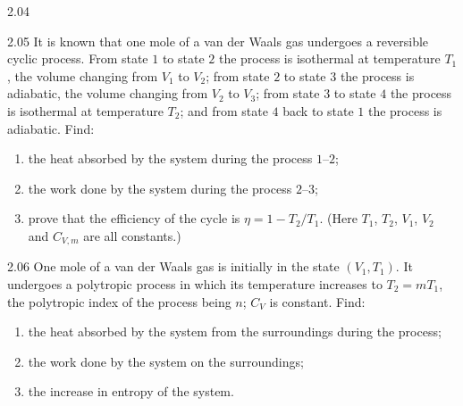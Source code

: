 \begin{figbox}{2.04}
\end{figbox}

\begin{problem}{2.05}
It is known that one mole of a van der Waals gas undergoes a reversible cyclic process. From state $1$ to state $2$ the process is isothermal at temperature $T_1$, the volume changing from $V_1$ to $V_2$; from state $2$ to state $3$ the process is adiabatic, the volume changing from $V_2$ to $V_3$; from state $3$ to state $4$ the process is isothermal at temperature $T_2$; and from state $4$ back to state $1$ the process is adiabatic. Find:
\begin{enumerate}[label=(\arabic*),leftmargin=2.2em,itemsep=1pt,topsep=2pt]
\item the heat absorbed by the system during the process $1$--$2$;
\item the work done by the system during the process $2$--$3$;
\item prove that the efficiency of the cycle is $\eta = 1-T_2/T_1$. (Here $T_1$, $T_2$, $V_1$, $V_2$ and $C_{V,m}$ are all constants.)
\end{enumerate}
\end{problem}

\begin{problem}{2.06}
One mole of a van der Waals gas is initially in the state $(V_1, T_1)$. It undergoes a polytropic process in which its temperature increases to $T_2 = mT_1$, the polytropic index of the process being $n$; $C_V$ is constant. Find:
\begin{enumerate}[label=(\arabic*),leftmargin=2.2em,itemsep=1pt,topsep=2pt]
\item the heat absorbed by the system from the surroundings during the process;
\item the work done by the system on the surroundings;
\item the increase in entropy of the system.
\end{enumerate}
\end{problem}

